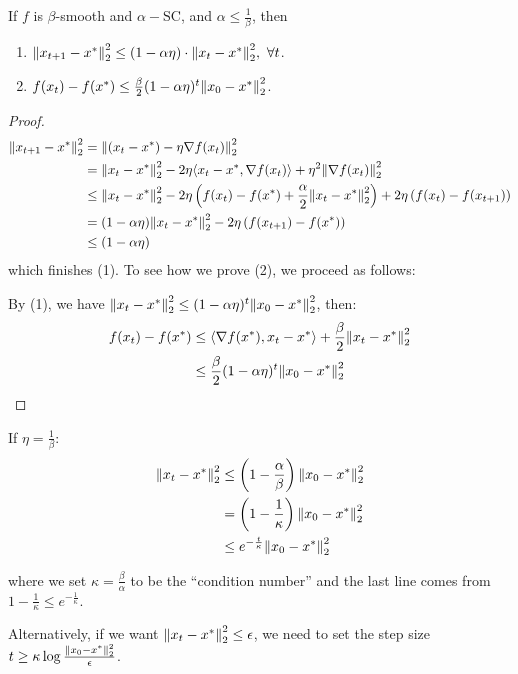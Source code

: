 \begin{theorem}
    If \(f\) is \(\beta\)-smooth and \(\alpha-\text{SC}\), and \(\alpha \leq \frac{1}{\beta}\), 
    then 
    \begin{enumerate}
        \item \(\norm{x_{t+1} - x^*}_2^2 \leq (1 - \alpha \eta) \cdot \norm{x_t - x^*}_2^2, \ \forall t\). 
        \item \(f(x_t) - f(x^*) \leq \frac{\beta}{2} (1 - \alpha \eta)^t \norm{x_0 - x^*}_2^2\). 
    \end{enumerate}
\end{theorem}


\begin{proof}
    \begin{align*}
        \norm{x_{t+1} - x^*}_2^2 &= \norm{ (x_t - x^*) - \eta \nabla f(x_t)}_2^2 \\ 
        &= \norm{ x_t - x^*}_2^2 - 2 \eta \langle x_t - x^*, \nabla f(x_t) \rangle + \eta^2 
        \norm{ \nabla f(x_t) }_2^2 \\ 
        &\leq \norm{ x_t - x^*}_2^2 - 2 \eta \left( f(x_t) - f(x^*) + \frac{\alpha}{2}
        \norm{x_t - x^*}^2_2\right) + 2 \eta \left( f(x_t) - f(x_{t+1}) \right) \\ 
        &= (1 - \alpha \eta) \norm{x_t - x^*}_2^2 - 2 \eta \left( f(x_{t+1}) - f(x^*) \right) \\ 
        &\leq (1 - \alpha \eta)
    \end{align*}
    which finishes (1). To see how we prove (2), we proceed as follows: 

    By (1), we have \(\norm{x_t - x^*}_2^2 \leq (1 - \alpha \eta)^t \norm{x_0 - x^*}_2^2\), then: 
    \begin{align*}
        f(x_t) - f(x^*) &\leq \langle \nabla f(x^*), x_t - x^* \rangle + \frac{\beta}{2} \norm{x_t - x^*}_2^2 \\ 
        &\leq \frac{\beta}{2} (1 - \alpha \eta)^t \norm{x_0 - x^*}_2^2 
    \end{align*}
\end{proof}

\begin{remark}
    If \(\eta = \frac{1}{\beta}\): 
    \begin{align*}
        \norm{x_t - x^*}_2^2 &\leq \left(1 - \frac{\alpha}{\beta}\right) \norm{x_0 - x^*}_2^2 \\
        &= \left(1 - \frac{1}{\kappa}\right)  \norm{x_0 - x^*}_2^2 \\ 
        &\leq e^{- \frac{t}{\kappa}}  \norm{x_0 - x^*}_2^2
    \end{align*}

    where we set \(\kappa = \frac{\beta}{\alpha}\) to be the ``condition number'' and the last 
    line comes from \(1 - \frac{1}{\kappa} \leq e^{- \frac{1}{\kappa}}\). 

    Alternatively, if we want \( \norm{x_t - x^*}_2^2 \leq \epsilon\), we need to set 
    the step size \(t \geq \kappa \log \frac{\norm{x_0 - x^*}_2^2}{\epsilon}\). 
\end{remark}